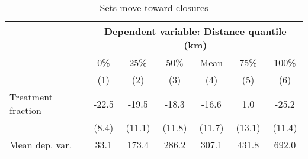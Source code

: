 \begin{table}[tb]
\centering
\caption{Sets move toward closures} 
\label{change_distance_closure}
\begin{tabular}{lcccccc}
   \toprule & \multicolumn{6}{c}{Dependent variable: Distance quantile (km)}  \\  \midrule  & 0\% & 25\% & 50\% & Mean & 75\% & 100\% \\ 
   & (1) & (2) & (3) & (4) & (5) & (6) \\ 
   \midrule Treatment fraction & -22.5 & -19.5 & -18.3 & -16.6 & 1.0 & -25.2 \\ 
   & (8.4) & (11.1) & (11.8) & (11.7) & (13.1) & (11.4) \\ 
   \midrule Mean dep. var. & 33.1 & 173.4 & 286.2 & 307.1 & 431.8 & 692.0 \\ \bottomrule 
  \end{tabular}
\end{table}
